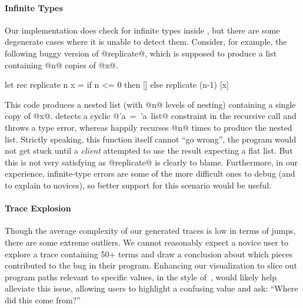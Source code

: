 \paragraph{Infinite Types}
Our implementation does check for infinite types inside \forcesym, but
there are some degenerate cases where it is unable to detect
them. Consider, for example, the following buggy version of @replicate@,
which is supposed to produce a list containing @n@ copies of @x@.
%
\begin{code}
  let rec replicate n x =
    if n <= 0 then
      []
    else
      replicate (n-1) [x]
\end{code}
%
This code produces a nested list (with @n@ levels of nesting) containing
a single copy of @x@. \ocaml detects a cyclic \hbox{@'a = 'a list@}
constraint in the recursive call and throws a type error, whereas
\nanomaly happily recurses @n@ times to produce the nested list.
Strictly speaking, this function itself cannot ``go wrong'', the
program would not get stuck until a \emph{client} attempted to use the
result expecting a flat list. But this is not very satisfying as
@replicate@ is clearly to blame. Furthermore, in our experience,
infinite-type errors are some of the more difficult ones to debug (and
to explain to novices), so better support for this scenario would be
useful.

\paragraph{Trace Explosion}
Though the average complexity of our generated traces is low in terms of
jumps, there are some extreme outliers. We cannot reasonably expect a
novice user to explore a trace containing 50+ terms and draw a
conclusion about which pieces contributed to the bug in their
program. Enhancing our visualization to slice out program paths relevant
to specific values, \eg in the style of~\cite{perera_functional_2012},
would likely help alleviate this issue, allowing users to
highlight a confusing value and ask: ``Where did this come from?''


